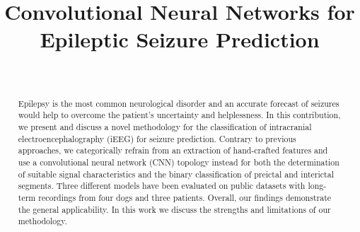 \documentclass[a4paper, conference]{IEEEtran}
\begin{document}


\newcommand{\mc}[3]{\multicolumn{#1}{#2}{#3}}
\title{Convolutional Neural Networks for \\ Epileptic Seizure Prediction}


\author{\\
}





\maketitle

\begin{abstract}
Epilepsy is the most common neurological disorder and an accurate forecast of seizures would help to overcome the patient's uncertainty and helplessness. In this contribution, we present and discuss a novel methodology for the classification of intracranial electroencephalography (iEEG) for seizure prediction. Contrary to previous approaches, we categorically refrain from an extraction of hand-crafted features and use a convolutional neural network (CNN) topology instead for both the determination of suitable signal characteristics and the binary classification of preictal and interictal segments. Three different models have been evaluated on public datasets with long-term recordings from four dogs and three patients. Overall, our findings demonstrate the general applicability. In this work we discuss the strengths and limitations of our methodology.


\end{abstract} 
\end{document}
